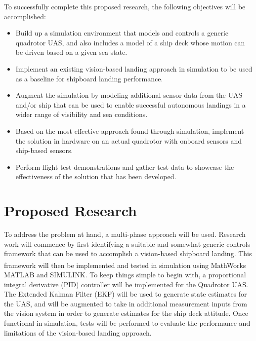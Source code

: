 \documentclass[12pt, letterpaper]{article}
\begin{document}
To successfully complete this proposed research, the following objectives will be accomplished:


\begin{itemize}

	\item Build up a simulation environment that models and controls a generic quadrotor UAS, and also includes a model of a ship deck whose motion can be driven based on a given sea state.

	\item Implement an existing vision-based landing approach in simulation to be used as a baseline for shipboard landing performance.  

	\item Augment the simulation by modeling additional sensor data from the UAS and/or ship that can be used to enable successful autonomous landings in a wider range of visibility and sea conditions.

	\item Based on the most effective approach found through simulation, implement the solution in hardware on an actual quadrotor with onboard sensors and ship-based sensors.
	
	\item Perform flight test demonstrations and gather test data to showcase the effectiveness of the solution that has been developed.

\end{itemize}

\section{Proposed Research}

To address the problem at hand, a multi-phase approach will be used.  Research work will commence by first identifying a suitable and somewhat generic controls framework that can be used to accomplish a vision-based shipboard landing.  This framework will then be implemented and tested in simulation using MathWorks\textsuperscript{\textregistered} MATLAB and SIMULINK.  To keep things simple to begin with, a proportional integral derivative (PID) controller will be implemented for the Quadrotor UAS.  The Extended Kalman Filter (EKF) will be used to generate state estimates for the UAS, and will be augmented to take in additional measurement inputs from the vision system in order to generate estimates for the ship deck attitude.  Once functional in simulation, tests will be performed to evaluate the performance and limitations of the vision-based landing approach. 
\end{document}
